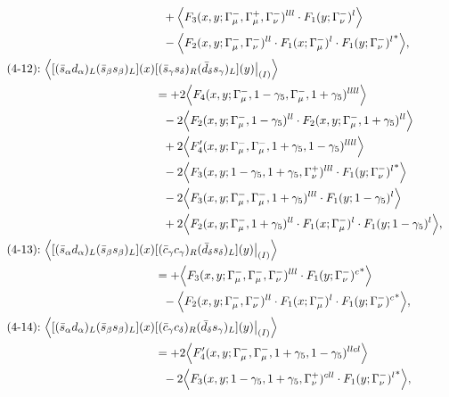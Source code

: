 \begin{align}
\notag\\*&\ \ 
 + \Big\langle F_3(x,y;\Gamma_\mu^-,\Gamma_\mu^+,\Gamma_\nu^-)^{lll} \cdot F_1(y;\Gamma_\nu^-)^l\Big\rangle
\notag\\*&\ \ 
 - \Big\langle F_2(x,y;\Gamma_\mu^-,\Gamma_\nu^-)^{ll} \cdot F_1(x;\Gamma_\mu^-)^l \cdot {F_1(y;\Gamma_\nu^-)^l}^*\Big\rangle,
\\
\mbox{(4-12):}\ 
\Big\langle
[(\bar s_\alpha d_\alpha)_L(\bar s_\beta s_\beta)_L](x)&
[(\bar s_\gamma s_\delta)_R(\bar d_\delta s_\gamma)_L](y)\big|_{(I)}
\Big\rangle
\notag\\*
&=
 + 2\Big\langle F_4(x,y;\Gamma_\mu^-,1-\gamma_5,\Gamma_\mu^-,1+\gamma_5)^{llll}\Big\rangle
\notag\\*&\ \ 
-2\Big\langle F_2(x,y;\Gamma_\mu^-,1-\gamma_5)^{ll} \cdot F_2(x,y;\Gamma_\mu^-,1+\gamma_5)^{ll}\Big\rangle
\notag\\*&\ \ 
 + 2\Big\langle F_4'(x,y;\Gamma_\mu^-,\Gamma_\mu^-,1+\gamma_5,1-\gamma_5)^{llll}\Big\rangle
\notag\\*&\ \ 
-2\Big\langle F_3(x,y;1-\gamma_5,1+\gamma_5,\Gamma_\nu^+)^{lll} \cdot {F_1(y;\Gamma_\nu^-)^l}^*\Big\rangle
\notag\\*&\ \ 
-2\Big\langle F_3(x,y;\Gamma_\mu^-,\Gamma_\mu^-,1+\gamma_5)^{lll} \cdot F_1(y;1-\gamma_5)^l\Big\rangle
\notag\\*&\ \ 
 + 2\Big\langle F_2(x,y;\Gamma_\mu^-,1+\gamma_5)^{ll} \cdot F_1(x;\Gamma_\mu^-)^l \cdot F_1(y;1-\gamma_5)^l\Big\rangle,
\\
\mbox{(4-13):}\ 
\Big\langle
[(\bar s_\alpha d_\alpha)_L(\bar s_\beta s_\beta)_L](x)&
[(\bar c_\gamma c_\gamma)_R(\bar d_\delta s_\delta)_L](y)\big|_{(I)}
\Big\rangle
\notag\\*
&=
 + \Big\langle F_3(x,y;\Gamma_\mu^-,\Gamma_\mu^-,\Gamma_\nu^-)^{lll} \cdot {F_1(y;\Gamma_\nu^-)^c}^*\Big\rangle
\notag\\*&\ \ 
 - \Big\langle F_2(x,y;\Gamma_\mu^-,\Gamma_\nu^-)^{ll} \cdot F_1(x;\Gamma_\mu^-)^l \cdot {F_1(y;\Gamma_\nu^-)^c}^*\Big\rangle,
\\
\mbox{(4-14):}\ 
\Big\langle
[(\bar s_\alpha d_\alpha)_L(\bar s_\beta s_\beta)_L](x)&
[(\bar c_\gamma c_\delta)_R(\bar d_\delta s_\gamma)_L](y)\big|_{(I)}
\Big\rangle
\notag\\*
&=
 + 2\Big\langle F_4'(x,y;\Gamma_\mu^-,\Gamma_\mu^-,1+\gamma_5,1-\gamma_5)^{llcl}\Big\rangle
\notag\\*&\ \ 
-2\Big\langle F_3(x,y;1-\gamma_5,1+\gamma_5,\Gamma_\nu^+)^{cll} \cdot {F_1(y;\Gamma_\nu^-)^l}^*\Big\rangle,
\\

\end{align}
